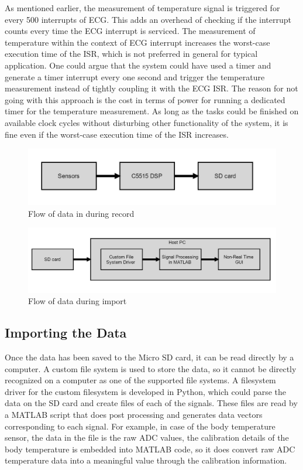As mentioned earlier, the measurement of temperature signal is
triggered for every 500 interrupts of ECG. This adds an overhead of
checking if the interrupt counts every time the ECG interrupt is
serviced.  The measurement of temperature within the context of ECG
interrupt increases the worst-case execution time of the ISR, which
is not preferred in general for typical application. One could argue
that the system could have used a timer and generate a timer
interrupt every one second and trigger the temperature measurement
instead of tightly coupling it with the ECG ISR. The reason for not
going with this approach is the cost in terms of power for running a
dedicated timer for the temperature measurement. As long as the tasks
could be finished on available clock cycles without disturbing other
functionality of the system, it is fine even if the worst-case
execution time of the ISR increases.

 \begin{figure}
 	\centering
 	\includegraphics[scale = 0.5 ]{record_dataflow}
\caption{Flow of data in during record}
\label{record_datalow}
 \end{figure}

 \begin{figure}
	\centering
	\includegraphics[scale = 0.5 ]{play_dataflow}
\caption{Flow of data during import}
\label{play_dataflow}
\end{figure}

\subsection{Importing the Data}

Once the data has been saved to the Micro SD card, it can be read
directly by a computer. A custom file system is used to store the
data, so it cannot be directly recognized on a computer as one of the
supported file systems. A filesystem driver for the custom filesystem
is developed in Python, which could parse the data on the SD card and
create files of each of the signals. These files are read by a MATLAB
script that does post processing and generates data vectors
corresponding to each signal.  For example, in case of the body
temperature sensor, the data in the file is the raw ADC values, the
calibration details of the body temperature is embedded into MATLAB
code, so it does convert raw ADC temperature data into a meaningful
value through the calibration information. 



